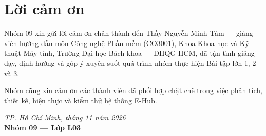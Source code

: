 \section*{Lời cảm ơn}

Nhóm 09 xin gửi lời cảm ơn chân thành đến Thầy Nguyễn Minh Tâm --- giảng viên hướng dẫn môn Công nghệ Phần mềm (CO3001), Khoa Khoa học và Kỹ thuật Máy tính, Trường Đại học Bách khoa --- ĐHQG-HCM, đã tận tình giảng dạy, định hướng và góp ý xuyên suốt quá trình nhóm thực hiện Bài tập lớn 1, 2 và 3.

Nhóm cũng xin cảm ơn các thành viên đã phối hợp chặt chẽ trong việc phân tích, thiết kế, hiện thực và kiểm thử hệ thống E-Hub.

\vspace{0.5cm}
\begin{flushright}
\textit{TP. Hồ Chí Minh, tháng 11 năm 2026}\\
\textbf{Nhóm 09 --- Lớp L03}
\end{flushright}
\newpage
